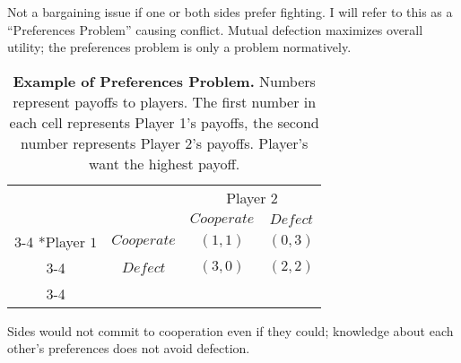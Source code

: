 \documentclass[11pt]{article}
\begin{document}
Not a bargaining issue if one or both sides prefer fighting. I will
refer to this as a ``Preferences Problem'' causing conflict. Mutual
defection maximizes overall utility; the preferences problem is only a
problem normatively.

\begin{table}[h!]
\begin{center}
\setlength{\extrarowheight}{2pt}
\begin{tabular}{cc|c|c|}
    & \multicolumn{1}{c}{} & \multicolumn{2}{c}{Player $2$}\\
    & \multicolumn{1}{c}{} & \multicolumn{1}{c}{$Cooperate$}  & \multicolumn{1}{c}{$Defect$} \\\cline{3-4}
    \multirow{2}*{Player $1$}  & $Cooperate$ & $(1,1)$ & $(0,3)$ \\\cline{3-4}
      & $Defect$ & $(3,0)$ & $(2,2)$ \\\cline{3-4}
\end{tabular}
\caption{\label{tab:prefProb}\textbf{Example of Preferences Problem.} Numbers represent payoffs to players.  The first number in each cell represents Player 1's payoffs, the second number represents Player 2's payoffs.  Player's want the highest payoff.}
\end{center}
\end{table}

Sides would not commit to cooperation even if they could; knowledge
about each other's preferences does not avoid defection.
\end{document}
